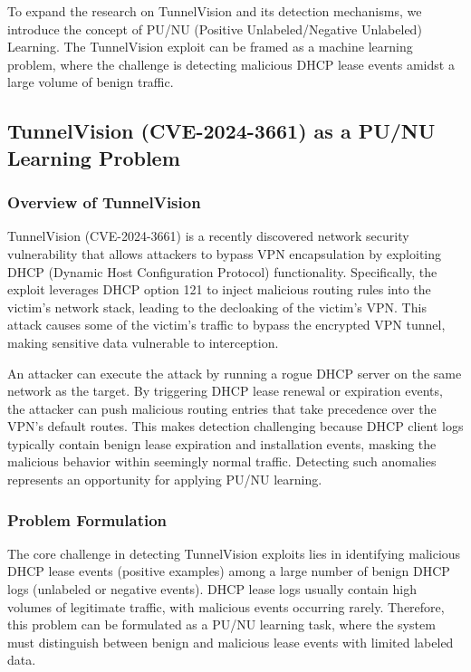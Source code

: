\documentclass[conference]{IEEEtran}
\begin{document}
    To expand the research on TunnelVision and its detection mechanisms, we introduce the concept of PU/NU (Positive Unlabeled/Negative Unlabeled) Learning. The TunnelVision exploit can be framed as a machine learning problem, where the challenge is detecting malicious DHCP lease events amidst a large volume of benign traffic.

    \subsection{TunnelVision (CVE-2024-3661) as a PU/NU Learning Problem}
    
        \subsubsection{Overview of TunnelVision}
        
            TunnelVision (CVE-2024-3661) is a recently discovered network security vulnerability that allows attackers to bypass VPN encapsulation by exploiting DHCP (Dynamic Host Configuration Protocol) functionality. Specifically, the exploit leverages DHCP option 121 to inject malicious routing rules into the victim’s network stack, leading to the decloaking of the victim’s VPN. This attack causes some of the victim's traffic to bypass the encrypted VPN tunnel, making sensitive data vulnerable to interception.
            
            An attacker can execute the attack by running a rogue DHCP server on the same network as the target. By triggering DHCP lease renewal or expiration events, the attacker can push malicious routing entries that take precedence over the VPN’s default routes. This makes detection challenging because DHCP client logs typically contain benign lease expiration and installation events, masking the malicious behavior within seemingly normal traffic. Detecting such anomalies represents an opportunity for applying PU/NU learning.
        
        \subsubsection{Problem Formulation}
        
            The core challenge in detecting TunnelVision exploits lies in identifying malicious DHCP lease events (positive examples) among a large number of benign DHCP logs (unlabeled or negative events). DHCP lease logs usually contain high volumes of legitimate traffic, with malicious events occurring rarely. Therefore, this problem can be formulated as a PU/NU learning task, where the system must distinguish between benign and malicious lease events with limited labeled data.
        
\end{document}

